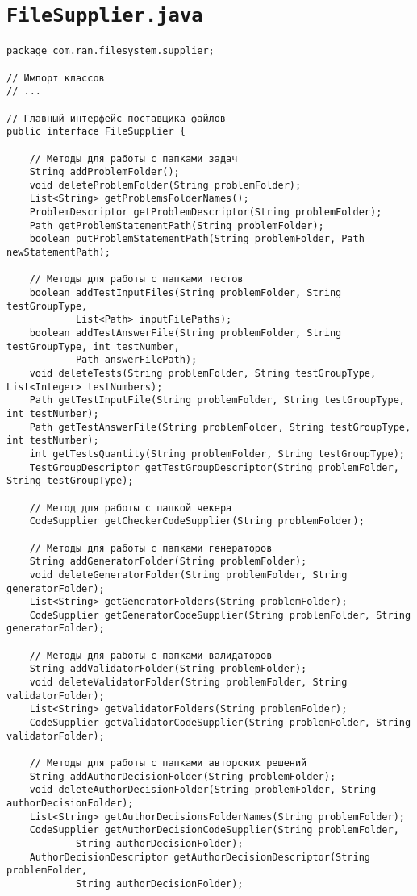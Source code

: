 \section*{\texttt{FileSupplier.java}}
\begin{verbatim}
package com.ran.filesystem.supplier;

// Импорт классов
// ...

// Главный интерфейс поставщика файлов
public interface FileSupplier {

    // Методы для работы с папками задач
    String addProblemFolder();
    void deleteProblemFolder(String problemFolder);
    List<String> getProblemsFolderNames();
    ProblemDescriptor getProblemDescriptor(String problemFolder);
    Path getProblemStatementPath(String problemFolder);
    boolean putProblemStatementPath(String problemFolder, Path newStatementPath);
    
    // Методы для работы с папками тестов
    boolean addTestInputFiles(String problemFolder, String testGroupType,
            List<Path> inputFilePaths);
    boolean addTestAnswerFile(String problemFolder, String testGroupType, int testNumber,
            Path answerFilePath);
    void deleteTests(String problemFolder, String testGroupType, List<Integer> testNumbers);
    Path getTestInputFile(String problemFolder, String testGroupType, int testNumber);
    Path getTestAnswerFile(String problemFolder, String testGroupType, int testNumber);
    int getTestsQuantity(String problemFolder, String testGroupType);
    TestGroupDescriptor getTestGroupDescriptor(String problemFolder, String testGroupType);
    
    // Метод для работы с папкой чекера
    CodeSupplier getCheckerCodeSupplier(String problemFolder);

    // Методы для работы с папками генераторов
    String addGeneratorFolder(String problemFolder);
    void deleteGeneratorFolder(String problemFolder, String generatorFolder);
    List<String> getGeneratorFolders(String problemFolder);
    CodeSupplier getGeneratorCodeSupplier(String problemFolder, String generatorFolder);
    
    // Методы для работы с папками валидаторов
    String addValidatorFolder(String problemFolder);
    void deleteValidatorFolder(String problemFolder, String validatorFolder);
    List<String> getValidatorFolders(String problemFolder);
    CodeSupplier getValidatorCodeSupplier(String problemFolder, String validatorFolder);

    // Методы для работы с папками авторских решений
    String addAuthorDecisionFolder(String problemFolder);
    void deleteAuthorDecisionFolder(String problemFolder, String authorDecisionFolder);
    List<String> getAuthorDecisionsFolderNames(String problemFolder);
    CodeSupplier getAuthorDecisionCodeSupplier(String problemFolder,
            String authorDecisionFolder);
    AuthorDecisionDescriptor getAuthorDecisionDescriptor(String problemFolder,
            String authorDecisionFolder);


\end{verbatim}
